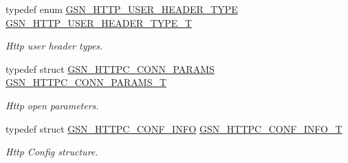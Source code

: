 \begin{DoxyCompactItemize}
typedef enum \hyperlink{a00665_ga46b2de5d0afbd35d93a0426f601866d9}{GSN\_\-HTTP\_\-USER\_\-HEADER\_\-TYPE} \hyperlink{a00665_gacdf2ed5f026ce7b549a8151c0a5f0129}{GSN\_\-HTTP\_\-USER\_\-HEADER\_\-TYPE\_\-T}
\begin{DoxyCompactList}\small\item\em Http user header types. \end{DoxyCompactList}\item 
typedef struct \hyperlink{a00094}{GSN\_\-HTTPC\_\-CONN\_\-PARAMS} \hyperlink{a00665_ga5e3ebb30a4f8cfd9e99f04e17839d148}{GSN\_\-HTTPC\_\-CONN\_\-PARAMS\_\-T}
\begin{DoxyCompactList}\small\item\em Http open parameters. \end{DoxyCompactList}\item 
typedef struct \hyperlink{a00093}{GSN\_\-HTTPC\_\-CONF\_\-INFO} \hyperlink{a00665_gaaf13b52fc631f1baf542db4a4403369c}{GSN\_\-HTTPC\_\-CONF\_\-INFO\_\-T}
\begin{DoxyCompactList}\small\item\em Http Config structure. \end{DoxyCompactList}\end{DoxyCompactItemize}
